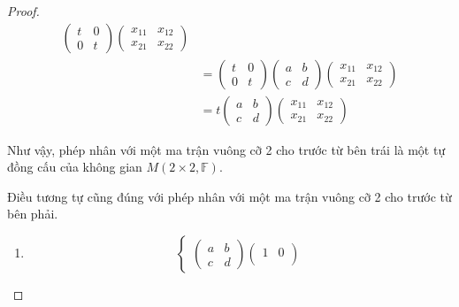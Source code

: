 \documentclass[class=nhvh-linear-algebra,crop=false]{standalone}
\begin{document}
\begin{proof}
\begin{align*}
\begin{pmatrix}
            t & 0 \\
            0 & t
        \end{pmatrix}
        \begin{pmatrix}
            x_{11} & x_{12} \\
            x_{21} & x_{22}
        \end{pmatrix}          \\
                             & =
        \begin{pmatrix}
            t & 0 \\
            0 & t
        \end{pmatrix}
        \begin{pmatrix}
            a & b \\
            c & d
        \end{pmatrix}
        \begin{pmatrix}
            x_{11} & x_{12} \\
            x_{21} & x_{22}
        \end{pmatrix}          \\
                             & =
        t
        \begin{pmatrix}
            a & b \\
            c & d
        \end{pmatrix}
        \begin{pmatrix}
            x_{11} & x_{12} \\
            x_{21} & x_{22}
        \end{pmatrix}
    \end{align*}
    \par Như vậy, phép nhân với một ma trận vuông cỡ 2 cho trước từ bên trái là một tự đồng cấu của không gian $M(2\times 2,\mathbb{F})$.
    \par Điều tương tự cũng đúng với phép nhân với một ma trận vuông cỡ 2 cho trước từ bên phải.
    \begin{enumerate}[label = (\alph*)]
        \item
              \[
                  \begin{cases}
                      \begin{pmatrix}
                          a & b \\
                          c & d
                      \end{pmatrix}
                      \begin{pmatrix}
                          1 & 0 \\

\end{pmatrix}
\end{cases}\]
\end{enumerate}
\end{proof}
\end{document}
